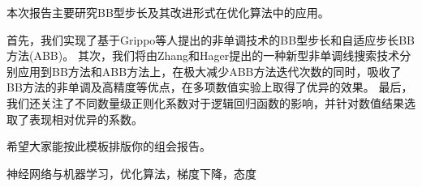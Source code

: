 
\clearpage
\titleformat{\chapter}{\center\sanhao\bf}{\chaptertitlename}{0.5em}{}
\titleformat{\chapter}{\sanhao\bf}{\chaptertitlename}{0.5em}{}
\setcounter{page}{1}


本次报告主要研究BB型步长及其改进形式在优化算法中的应用。

首先，我们实现了基于Grippo等人提出的非单调技术\cite{grippo1991class}的BB型步长\cite{barzilai1988two}和自适应步长BB方法(ABB)\cite{zhou2006gradient}。
其次，我们将由Zhang和Hager提出的一种新型非单调线搜索技术\cite{zhang2004nonmonotone}分别应用到BB方法和ABB方法上，在极大减少ABB方法迭代次数的同时，吸收了BB方法的非单调及高精度等优点，在多项数值实验上取得了优异的效果。
最后，我们还关注了不同数量级正则化系数对于逻辑回归函数的影响，并针对数值结果选取了表现相对优异的系数。

希望大家能按此模板排版你的组会报告。

\vspace{\baselineskip}
 神经网络与机器学习，优化算法，梯度下降，态度



\titlespacing{\chapter}{0pt}{-6mm}{5mm}
